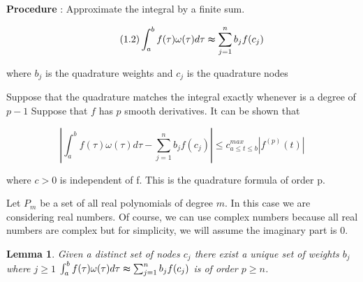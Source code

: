 \documentclass[12pt,a4paper]{article}
\newtheorem{lemma}[theorem]{Lemma}
\begin{document}
\noindent
\textbf{Procedure} : Approximate the integral by a finite sum.

\begin{equation}\tag{1.2}\label{eqn1.2}
\int_a^b f(\tau)\omega(\tau)d\tau \thickapprox \sum_{j=1}^nb_jf(c_j)
\end{equation}

\noindent
where $b_j$ is the quadrature weights and $c_j$ is the quadrature nodes

\noindent
Suppose that the quadrature matches the integral exactly whenever is a degree of $p-1$ \vspace{5pt}
Suppose that $f$ has $p$ smooth derivatives. \vspace{5pt}
It can be shown that \vspace{5pt}

\begin{equation*}
\left| \int_a^b f(\tau)\omega(\tau)d\tau - \sum_{j=1}^nb_jf(c_j) \right| \leq c_{a \leq t \leq b}^{max}\left| f ^{(p)}(t)\right|  
\end{equation*}

\noindent
where $c>0$ is independent of f. This is the quadrature formula of order p.

\noindent
Let $P_m$ be a set of all real polynomials of degree $m$.
In this case we are considering real numbers. Of course, we can use complex numbers because all real numbers are complex but for simplicity, we will assume the imaginary part is $0$.

\begin{lemma}
Given a distinct set of nodes $c_j$ there exist a unique set of weights $b_j$ where $j\geq 1$
$\int_a^bf(\tau)\omega(\tau)d\tau \thickapprox \sum_{j=1}^nb_jf(c_j)$ is of order $p \geq n$.
\end{lemma}
\end{document}
